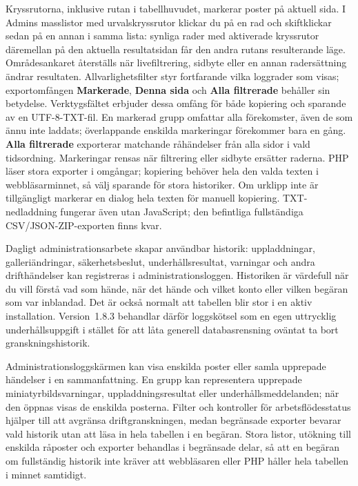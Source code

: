 \documentclass[11pt,a4paper]{article}
\newcommand{\version}{1.8.3}
\newcommand{\ui}[1]{\textbf{#1}}
\begin{document}
Kryssrutorna, inklusive rutan i tabellhuvudet, markerar poster på aktuell sida.
I Admins masslistor med urvalskryssrutor klickar du på en rad och skiftklickar
sedan på en annan i samma lista: synliga rader med aktiverade kryssrutor
däremellan på den aktuella resultatsidan får den andra rutans resulterande läge.
Områdesankaret återställs när livefiltrering, sidbyte eller en annan
radersättning ändrar resultaten. Allvarlighetsfilter styr fortfarande vilka
loggrader som visas; exportomfången \ui{Markerade}, \ui{Denna sida} och \ui{Alla
filtrerade} behåller sin betydelse. Verktygsfältet erbjuder dessa omfång för
både kopiering och sparande av en UTF-8-TXT-fil. En markerad grupp omfattar alla
förekomster, även de som ännu inte laddats; överlappande enskilda markeringar
förekommer bara en gång. \ui{Alla filtrerade} exporterar matchande råhändelser
från alla sidor i vald tidsordning. Markeringar rensas när filtrering eller
sidbyte ersätter raderna. PHP läser stora exporter i omgångar; kopiering behöver
hela den valda texten i webbläsarminnet, så välj sparande för stora historiker.
Om urklipp inte är tillgängligt markerar en dialog hela texten för manuell
kopiering. TXT-nedladdning fungerar även utan JavaScript; den befintliga
fullständiga CSV/JSON-ZIP-exporten finns kvar.

Dagligt administrationsarbete skapar användbar historik: uppladdningar,
galleriändringar, säkerhetsbeslut, underhållsresultat, varningar och andra
drifthändelser kan registreras i administrationsloggen. Historiken är värdefull
när du vill förstå vad som hände, när det hände och vilket konto eller vilken
begäran som var inblandad. Det är också normalt att tabellen blir stor i en
aktiv installation. Version~\version{} behandlar därför loggskötsel som en egen
uttrycklig underhållsuppgift i stället för att låta generell databasrensning
oväntat ta bort granskningshistorik.

Administrationsloggskärmen kan visa enskilda poster eller samla upprepade
händelser i en sammanfattning. En grupp kan representera upprepade
miniatyrbildsvarningar, uppladdningsresultat eller underhållsmeddelanden; när
den öppnas visas de enskilda posterna. Filter och kontroller för
arbetsflödesstatus hjälper till att avgränsa driftgranskningen, medan begränsade
exporter bevarar vald historik utan att läsa in hela tabellen i en begäran.
Stora listor, utökning till enskilda råposter och exporter behandlas i
begränsade delar, så att en begäran om fullständig historik inte kräver att
webbläsaren eller PHP håller hela tabellen i minnet samtidigt.
\end{document}
